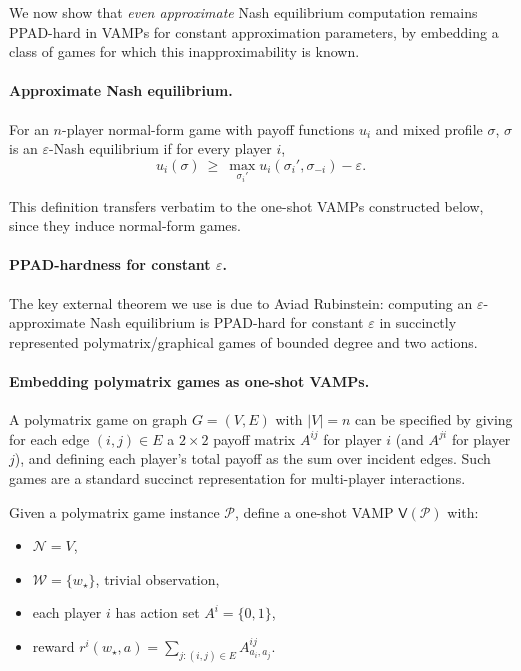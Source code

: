 We now show that \emph{even approximate} Nash equilibrium computation remains PPAD-hard in VAMPs for constant approximation parameters, by embedding a class of games for which this inapproximability is known.

\paragraph{Approximate Nash equilibrium.}
For an \(n\)-player normal-form game with payoff functions \(u_i\) and mixed profile \(\sigma\), \(\sigma\) is an \(\varepsilon\)-Nash equilibrium if for every player \(i\),
\[
u_i(\sigma)\ \ge\ \max_{\sigma_i'} u_i(\sigma_i',\sigma_{-i}) - \varepsilon.
\]

This definition transfers verbatim to the one-shot VAMPs constructed below, since they induce normal-form games.

\paragraph{PPAD-hardness for constant \(\varepsilon\).}
The key external theorem we use is due to Aviad Rubinstein: computing an \(\varepsilon\)-approximate Nash equilibrium is PPAD-hard for constant \(\varepsilon\) in succinctly represented polymatrix/graphical games of bounded degree and two actions.

\paragraph{Embedding polymatrix games as one-shot VAMPs.}
A polymatrix game on graph \(G=(V,E)\) with \(|V|=n\) can be specified by giving for each edge \((i,j)\in E\) a \(2\times 2\) payoff matrix \(A^{ij}\) for player \(i\) (and \(A^{ji}\) for player \(j\)), and defining each player's total payoff as the sum over incident edges. Such games are a standard succinct representation for multi-player interactions.

Given a polymatrix game instance \(\mathcal P\), define a one-shot VAMP \(\mathsf V(\mathcal P)\) with:
\begin{itemize}
\item \(\mathcal N = V\),
\item \(\mathcal W=\{w_\star\}\), trivial observation,
\item each player \(i\) has action set \(A^i=\{0,1\}\),
\item reward \(r^i(w_\star,a)=\sum_{j:(i,j)\in E} A^{ij}_{a_i,a_j}\).
\end{itemize}

